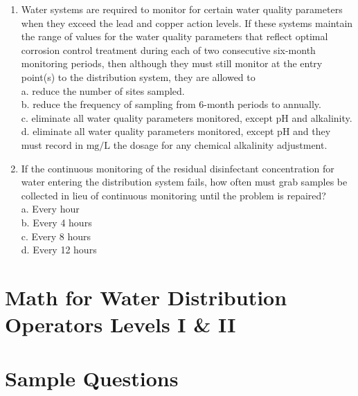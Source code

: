 \documentclass[10pt]{article}
\begin{document}
\begin{enumerate}
  \item Water systems are required to monitor for certain water quality parameters when they exceed the lead and copper action levels. If these systems maintain the range of values for the water quality parameters that reflect optimal corrosion control treatment during each of two consecutive six-month monitoring periods, then although they must still monitor at the entry point(s) to the distribution system, they are allowed to\\
a. reduce the number of sites sampled.\\
b. reduce the frequency of sampling from 6-month periods to annually.\\
c. eliminate all water quality parameters monitored, except $\mathrm{pH}$ and alkalinity.\\
d. eliminate all water quality parameters monitored, except $\mathrm{pH}$ and they must record in $\mathrm{mg} / \mathrm{L}$ the dosage for any chemical alkalinity adjustment.

  \item If the continuous monitoring of the residual disinfectant concentration for water entering the distribution system fails, how often must grab samples be collected in lieu of continuous monitoring until the problem is repaired?\\
a. Every hour\\
b. Every 4 hours\\
c. Every 8 hours\\
d. Every 12 hours

\end{enumerate}

\section{Math for Water Distribution Operators Levels I \& II}
\section{Sample Questions}
\end{document}
